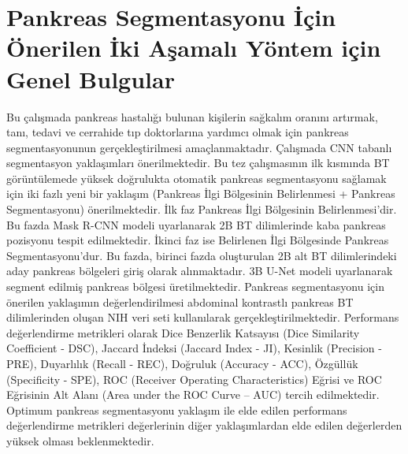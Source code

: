\section{Pankreas Segmentasyonu İçin Önerilen İki Aşamalı Yöntem için Genel Bulgular}
Bu çalışmada pankreas hastalığı bulunan kişilerin sağkalım oranını artırmak, tanı, tedavi ve cerrahide tıp doktorlarına yardımcı olmak için pankreas segmentasyonunun gerçekleştirilmesi amaçlanmaktadır. Çalışmada CNN tabanlı segmentasyon yaklaşımları önerilmektedir. Bu tez çalışmasının ilk kısmında BT görüntülemede yüksek doğrulukta otomatik pankreas segmentasyonu sağlamak için iki fazlı yeni bir yaklaşım (Pankreas İlgi Bölgesinin Belirlenmesi + Pankreas Segmentasyonu) önerilmektedir. İlk faz Pankreas İlgi Bölgesinin Belirlenmesi’dir. Bu fazda Mask R-CNN modeli uyarlanarak 2B BT dilimlerinde kaba pankreas pozisyonu tespit edilmektedir. İkinci faz ise Belirlenen İlgi Bölgesinde Pankreas Segmentasyonu’dur. Bu fazda, birinci fazda oluşturulan 2B alt BT dilimlerindeki aday pankreas bölgeleri giriş olarak alınmaktadır. 3B U-Net modeli uyarlanarak segment edilmiş pankreas bölgesi üretilmektedir. Pankreas segmentasyonu için önerilen yaklaşımın değerlendirilmesi abdominal kontrastlı pankreas BT dilimlerinden oluşan NIH veri seti kullanılarak gerçekleştirilmektedir. Performans değerlendirme metrikleri olarak Dice Benzerlik Katsayısı (Dice Similarity Coefficient - DSC), Jaccard İndeksi (Jaccard Index - JI), Kesinlik (Precision - PRE), Duyarlılık (Recall - REC), Doğruluk (Accuracy - ACC), Özgüllük (Specificity - SPE), ROC (Receiver Operating Characteristics) Eğrisi ve ROC Eğrisinin Alt Alanı (Area under the ROC Curve – AUC) tercih edilmektedir. Optimum pankreas segmentasyonu yaklaşım ile elde edilen performans değerlendirme metrikleri değerlerinin diğer yaklaşımlardan elde edilen değerlerden yüksek olması beklenmektedir. 

